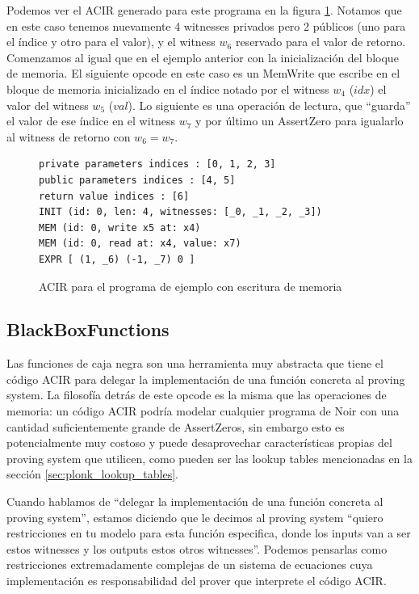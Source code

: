 Podemos ver el ACIR generado para este programa en la figura \ref{fig:ACIR_ejemplo_mem_write}. Notamos que en este caso tenemos nuevamente 4 witnesses privados pero 2 públicos (uno para el índice y otro para el valor), y el witness $w_6$ reservado para el valor de retorno. Comenzamos al igual que en el ejemplo anterior con la inicialización del bloque de memoria. El siguiente opcode en este caso es un MemWrite que escribe en el bloque de memoria inicializado en el índice notado por el witness $w_4$ ($idx$) el valor del witness $w_5$ ($val$). Lo siguiente es una operación de lectura, que “guarda'' el valor de ese índice en el witness $w_7$ y por último un AssertZero para igualarlo al witness de retorno con $w_6 = w_7$.

\begin{figure} 
\centering
\begin{minipage}{\textwidth}
\begin{verbatim}
private parameters indices : [0, 1, 2, 3]
public parameters indices : [4, 5]
return value indices : [6]
INIT (id: 0, len: 4, witnesses: [_0, _1, _2, _3]) 
MEM (id: 0, write x5 at: x4) 
MEM (id: 0, read at: x4, value: x7) 
EXPR [ (1, _6) (-1, _7) 0 ]
\end{verbatim}
\end{minipage}

\caption{ACIR para el programa de ejemplo con escritura de memoria}
\label{fig:ACIR_ejemplo_mem_write}
\end{figure}

\subsection{BlackBoxFunctions}
Las funciones de caja negra son una herramienta muy abstracta que tiene el código ACIR para delegar la implementación de una función concreta al proving system. La filosofía detrás de este opcode es la misma que las operaciones de memoria: un código ACIR podría modelar cualquier programa de Noir con una cantidad suficientemente grande de AssertZeros, sin embargo esto es potencialmente muy costoso y puede desaprovechar características propias del proving system que utilicen, como pueden ser las lookup tables mencionadas en la sección \ref{sec:plonk_lookup_tables}. 

Cuando hablamos de “delegar la implementación de una función concreta al proving system'', estamos diciendo que le decimos al proving system “quiero restricciones en tu modelo para esta función especifica, donde los inputs  van a ser estos witnesses y los outputs estos otros witnesses''. Podemos pensarlas como restricciones extremadamente complejas de un sistema de ecuaciones cuya implementación es responsabilidad del prover que interprete el código ACIR.

